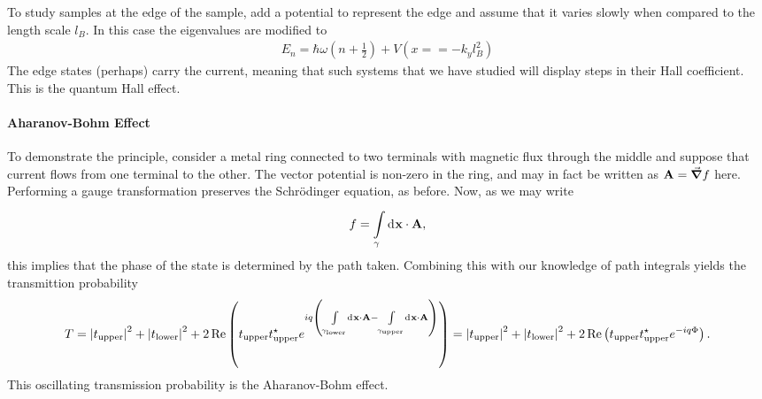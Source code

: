 To study samples at the edge of the sample, add a potential to represent the edge and assume that it varies slowly when compared to the length scale $l_{B}$. In this case the eigenvalues are modified to
\begin{align*}
	E_{n} = \hbar\omega(n + \frac{1}{2}) + V(x = = -k_{y}l_{B}^{2})
\end{align*}
The edge states (perhaps) carry the current, meaning that such systems that we have studied will display steps in their Hall coefficient. This is the quantum Hall effect.

\paragraph{Aharanov-Bohm Effect}
To demonstrate the principle, consider a metal ring connected to two terminals with magnetic flux through the middle and suppose that current flows from one terminal to the other. The vector potential is non-zero in the ring, and may in fact be written as $\vb{A} = \grad{f}$ here. Performing a gauge transformation preserves the Schrödinger equation, as before. Now, as we may write
\begin{align*}
	f = \int\limits_{\gamma}^{}\dd[]{\vb{x}}\cdot\vb{A},
\end{align*}
this implies that the phase of the state is determined by the path taken. Combining this with our knowledge of path integrals yields the transmittion probability
\begin{align*}
	T = \abs{t_{\text{upper}}}^{2} + \abs{t_{\text{lower}}}^{2} + 2\Re\left(t_{\text{upper}}t_{\text{upper}}^{\star}e^{iq\left(\int\limits_{\gamma_{\text{lower}}}^{}\dd[]{\vb{x}}\cdot\vb{A} - \int\limits_{\gamma_{\text{upper}}}^{}\dd[]{\vb{x}}\cdot\vb{A}\right)}\right) = \abs{t_{\text{upper}}}^{2} + \abs{t_{\text{lower}}}^{2} + 2\Re\left(t_{\text{upper}}t_{\text{upper}}^{\star}e^{-iq\Phi}\right).
\end{align*}
This oscillating transmission probability is the Aharanov-Bohm effect.
